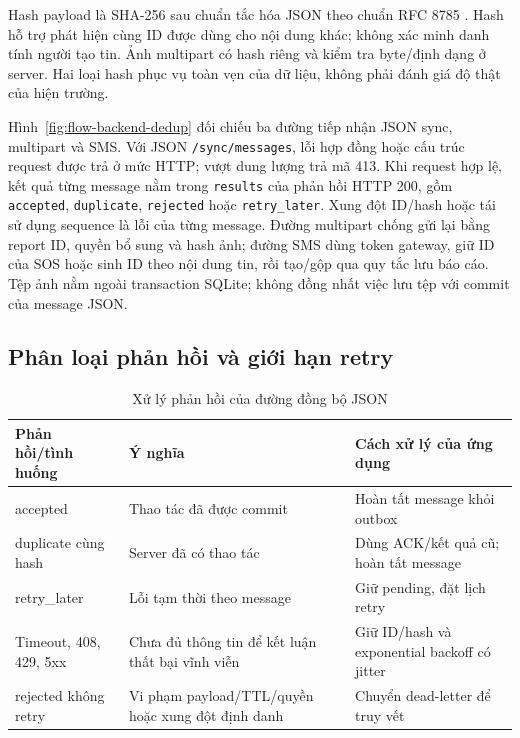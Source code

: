 Hash payload là SHA-256 sau chuẩn tắc hóa JSON theo chuẩn RFC 8785 \citep{rfc8785}. Hash hỗ trợ phát hiện cùng ID được dùng cho nội dung khác; không xác minh danh tính người tạo tin. Ảnh multipart có hash riêng và kiểm tra byte/định dạng ở server. Hai loại hash phục vụ toàn vẹn của dữ liệu, không phải đánh giá độ thật của hiện trường.

Hình~\ref{fig:flow-backend-dedup} đối chiếu ba đường tiếp nhận JSON sync, multipart và SMS. Với JSON \texttt{/sync/messages}, lỗi hợp đồng hoặc cấu trúc request được trả ở mức HTTP; vượt dung lượng trả mã 413. Khi request hợp lệ, kết quả từng message nằm trong \texttt{results} của phản hồi HTTP 200, gồm \texttt{accepted}, \texttt{duplicate}, \texttt{rejected} hoặc \texttt{retry\_later}. Xung đột ID/hash hoặc tái sử dụng sequence là lỗi của từng message. Đường multipart chống gửi lại bằng report ID, quyền bổ sung và hash ảnh; đường SMS dùng token gateway, giữ ID của SOS hoặc sinh ID theo nội dung tin, rồi tạo/gộp qua quy tắc lưu báo cáo. Tệp ảnh nằm ngoài transaction SQLite; không đồng nhất việc lưu tệp với commit của message JSON.



\subsection{Phân loại phản hồi và giới hạn retry}

\begin{table}[H]\centering\small
\caption{Xử lý phản hồi của đường đồng bộ JSON}\label{tab:sync-outcomes}
\begin{tabularx}{\textwidth}{P{.24\textwidth}P{.30\textwidth}X}
\toprule Phản hồi/tình huống & Ý nghĩa & Cách xử lý của ứng dụng \\\midrule
accepted & Thao tác đã được commit & Hoàn tất message khỏi outbox \\
duplicate cùng hash & Server đã có thao tác & Dùng ACK/kết quả cũ; hoàn tất message \\
retry\_later & Lỗi tạm thời theo message & Giữ pending, đặt lịch retry \\
Timeout, 408, 429, 5xx & Chưa đủ thông tin để kết luận thất bại vĩnh viễn & Giữ ID/hash và exponential backoff có jitter \\
rejected không retry & Vi phạm payload/TTL/quyền hoặc xung đột định danh & Chuyển dead-letter để truy vết \\
\bottomrule\end{tabularx}
\end{table}

